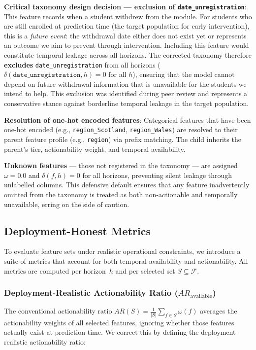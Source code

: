 \documentclass[a4paper,fleqn]{cas-sc}
\begin{document}
\textbf{Critical taxonomy design decision --- exclusion of \texttt{date\_unregistration}}: This feature records when a student withdrew from the module. For students who are still enrolled at prediction time (the target population for early intervention), this is a \textit{future event}: the withdrawal date either does not exist yet or represents an outcome we aim to prevent through intervention. Including this feature would constitute temporal leakage across all horizons. The corrected taxonomy therefore \textbf{excludes} \texttt{date\_unregistration} from all horizons ($\delta(\texttt{date\_unregistration}, h) = 0$ for all $h$), ensuring that the model cannot depend on future withdrawal information that is unavailable for the students we intend to help. This exclusion was identified during peer review and represents a conservative stance against borderline temporal leakage in the target population.

\textbf{Resolution of one-hot encoded features}: Categorical features that have been one-hot encoded (e.g., \texttt{region\_Scotland}, \texttt{region\_Wales}) are resolved to their parent feature profile (e.g., \texttt{region}) via prefix matching. The child inherits the parent's tier, actionability weight, and temporal availability.

\textbf{Unknown features} --- those not registered in the taxonomy --- are assigned $\omega = 0.0$ and $\delta(f, h) = 0$ for all horizons, preventing silent leakage through unlabelled columns. This defensive default ensures that any feature inadvertently omitted from the taxonomy is treated as both non-actionable and temporally unavailable, erring on the side of caution.

\subsection{Deployment-Honest Metrics}

To evaluate feature sets under realistic operational constraints, we introduce a suite of metrics that account for both temporal availability and actionability. All metrics are computed per horizon~$h$ and per selected set $S \subseteq \mathcal{F}$.

\subsubsection{Deployment-Realistic Actionability Ratio ($AR_{\text{available}}$)}
The conventional actionability ratio $AR(S) = \frac{1}{|S|}\sum_{f\in S} \omega(f)$ averages the actionability weights of all selected features, ignoring whether those features actually exist at prediction time. We correct this by defining the deployment-realistic actionability ratio:
\end{document}
